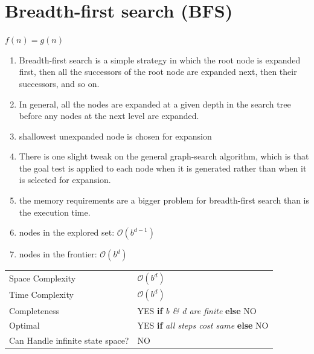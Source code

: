 \section{Breadth-first search (BFS) \cite{aci-1}}\label{Breadth-first search BFS}

\begin{center}
    $f(n) = g(n)$
\end{center}

\begin{enumerate}
    \item Breadth-first search is a simple strategy in which the root node is expanded first, then all the successors of the root node are expanded next, then their successors, and so on. 
    
    \item In general, all the nodes are expanded at a given depth in the search tree before any nodes at the next level are expanded.

    \item shallowest unexpanded node is chosen for expansion

    \item There is one slight tweak on the general graph-search algorithm, which is that the goal test is applied to each node when it is generated rather than when it is selected for expansion.

    \item  the memory requirements are a bigger problem for breadth-first search than is the execution time.

    \item nodes in the explored set: $\mathcal{O}(b^{d-1})$

    \item nodes in the frontier: $\mathcal{O}(b^{d})$
\end{enumerate}


\begin{customTableWrapper}{1.2}
\begin{longtable}{p{4cm} p{8cm}}
    Space Complexity & $\mathcal{O}(b^d)$ \\

    Time Complexity & $\mathcal{O}(b^d)$ \\

    \hline
    
    Completeness & YES \textbf{if} \textit{b \& d are finite} \textbf{else} NO\\

    Optimal & YES \textbf{if} \textit{all steps cost same} \textbf{else} NO \\

    Can Handle infinite state space? & NO \\
\end{longtable}
\end{customTableWrapper}


